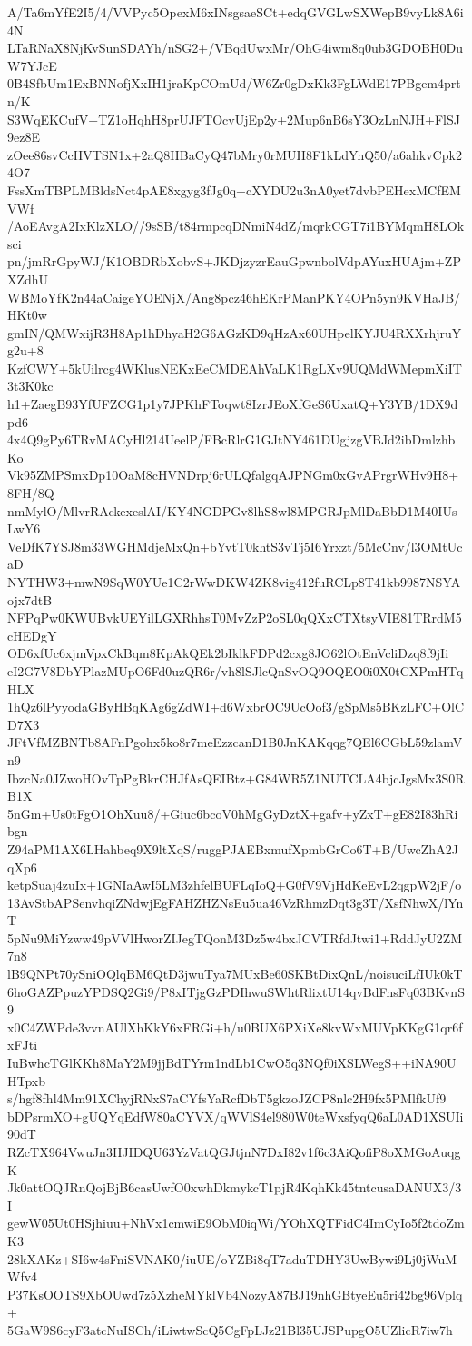 A/Ta6mYfE2I5/4/VVPyc5OpexM6xINsgsaeSCt+edqGVGLwSXWepB9vyLk8A6i4N
LTaRNaX8NjKvSunSDAYh/nSG2+/VBqdUwxMr/OhG4iwm8q0ub3GDOBH0DuW7YJcE
0B4SfbUm1ExBNNofjXxIH1jraKpCOmUd/W6Zr0gDxKk3FgLWdE17PBgem4prtn/K
S3WqEKCufV+TZ1oHqhH8prUJFTOcvUjEp2y+2Mup6nB6sY3OzLnNJH+FlSJ9ez8E
zOee86svCcHVTSN1x+2aQ8HBaCyQ47bMry0rMUH8F1kLdYnQ50/a6ahkvCpk24O7
FssXmTBPLMBldsNct4pAE8xgyg3fJg0q+cXYDU2u3nA0yet7dvbPEHexMCfEMVWf
/AoEAvgA2IxKlzXLO//9sSB/t84rmpcqDNmiN4dZ/mqrkCGT7i1BYMqmH8LOksci
pn/jmRrGpyWJ/K1OBDRbXobvS+JKDjzyzrEauGpwnbolVdpAYuxHUAjm+ZPXZdhU
WBMoYfK2n44aCaigeYOENjX/Ang8pcz46hEKrPManPKY4OPn5yn9KVHaJB/HKt0w
gmIN/QMWxijR3H8Ap1hDhyaH2G6AGzKD9qHzAx60UHpelKYJU4RXXrhjruYg2u+8
KzfCWY+5kUilrcg4WKlusNEKxEeCMDEAhVaLK1RgLXv9UQMdWMepmXiIT3t3K0kc
h1+ZaegB93YfUFZCG1p1y7JPKhFToqwt8IzrJEoXfGeS6UxatQ+Y3YB/1DX9dpd6
4x4Q9gPy6TRvMACyHl214UeelP/FBcRlrG1GJtNY461DUgjzgVBJd2ibDmlzhbKo
Vk95ZMPSmxDp10OaM8cHVNDrpj6rULQfalgqAJPNGm0xGvAPrgrWHv9H8+8FH/8Q
nmMylO/MlvrRAckexeslAI/KY4NGDPGv8lhS8wl8MPGRJpMlDaBbD1M40IUsLwY6
VeDfK7YSJ8m33WGHMdjeMxQn+bYvtT0khtS3vTj5I6Yrxzt/5McCnv/l3OMtUcaD
NYTHW3+mwN9SqW0YUe1C2rWwDKW4ZK8vig412fuRCLp8T41kb9987NSYAojx7dtB
NFPqPw0KWUBvkUEYilLGXRhhsT0MvZzP2oSL0qQXxCTXtsyVIE81TRrdM5cHEDgY
OD6xfUc6xjmVpxCkBqm8KpAkQEk2bIklkFDPd2cxg8JO62lOtEnVcliDzq8f9jIi
eI2G7V8DbYPlazMUpO6Fd0uzQR6r/vh8lSJlcQnSvOQ9OQEO0i0X0tCXPmHTqHLX
1hQz6lPyyodaGByHBqKAg6gZdWI+d6WxbrOC9UcOof3/gSpMs5BKzLFC+OlCD7X3
JFtVfMZBNTb8AFnPgohx5ko8r7meEzzcanD1B0JnKAKqqg7QEl6CGbL59zlamVn9
IbzcNa0JZwoHOvTpPgBkrCHJfAsQEIBtz+G84WR5Z1NUTCLA4bjcJgsMx3S0RB1X
5nGm+Us0tFgO1OhXuu8/+Giuc6bcoV0hMgGyDztX+gafv+yZxT+gE82I83hRibgn
Z94aPM1AX6LHahbeq9X9ltXqS/ruggPJAEBxmufXpmbGrCo6T+B/UwcZhA2JqXp6
ketpSuaj4zuIx+1GNIaAwI5LM3zhfelBUFLqIoQ+G0fV9VjHdKeEvL2qgpW2jF/o
13AvStbAPSenvhqiZNdwjEgFAHZHZNsEu5ua46VzRhmzDqt3g3T/XsfNhwX/lYnT
5pNu9MiYzww49pVVlHworZIJegTQonM3Dz5w4bxJCVTRfdJtwi1+RddJyU2ZM7n8
lB9QNPt70ySniOQlqBM6QtD3jwuTya7MUxBe60SKBtDixQnL/noisuciLfIUk0kT
6hoGAZPpuzYPDSQ2Gi9/P8xITjgGzPDIhwuSWhtRlixtU14qvBdFnsFq03BKvnS9
x0C4ZWPde3vvnAUlXhKkY6xFRGi+h/u0BUX6PXiXe8kvWxMUVpKKgG1qr6fxFJti
IuBwhcTGlKKh8MaY2M9jjBdTYrm1ndLb1CwO5q3NQf0iXSLWegS++iNA90UHTpxb
s/hgf8fhl4Mm91XChyjRNxS7aCYfsYaRcfDbT5gkzoJZCP8nlc2H9fx5PMlfkUf9
bDPsrmXO+gUQYqEdfW80aCYVX/qWVlS4el980W0teWxsfyqQ6aL0AD1XSUIi90dT
RZcTX964VwuJn3HJIDQU63YzVatQGJtjnN7DxI82v1f6c3AiQofiP8oXMGoAuqgK
Jk0attOQJRnQojBjB6casUwfO0xwhDkmykcT1pjR4KqhKk45tntcusaDANUX3/3I
gewW05Ut0HSjhiuu+NhVx1cmwiE9ObM0iqWi/YOhXQTFidC4ImCyIo5f2tdoZmK3
28kXAKz+SI6w4sFniSVNAK0/iuUE/oYZBi8qT7aduTDHY3UwBywi9Lj0jWuMWfv4
P37KsOOTS9XbOUwd7z5XzheMYklVb4NozyA87BJ19nhGBtyeEu5ri42bg96Vplq+
5GaW9S6cyF3atcNuISCh/iLiwtwScQ5CgFpLJz21Bl35UJSPupgO5UZlicR7iw7h
